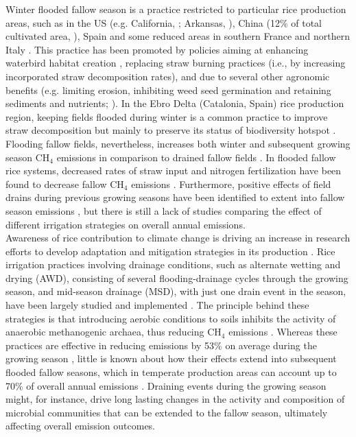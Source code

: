 Winter flooded fallow season is a practice restricted to particular rice production areas, such as in the US (e.g. California, \cite{fitzgerald2000}; Arkansas, \cite{reba2019}), China (12\% of total cultivated area, \cite{zhang2011}), Spain and some reduced areas in southern France and northern Italy \citep{pernollet2015}. This practice has been promoted by policies aiming at enhancing waterbird habitat creation \citep{elphick2010, tajiri2013effects}, replacing straw burning practices (i.e., by increasing incorporated straw decomposition rates), and due to several other agronomic benefits (e.g. limiting erosion, inhibiting weed seed germination and retaining sediments and nutrients; \cite{negri2020}). In the Ebro Delta (Catalonia, Spain) rice production region, keeping fields flooded during winter is a common practice to improve straw decomposition but mainly to preserve its status of biodiversity hotspot \citep{day2006, perez-mendez2022}. Flooding fallow fields, nevertheless, increases both winter and subsequent growing season CH$_{4}$ emissions in comparison to drained fallow fields \citep{cai2000}. In flooded fallow rice systems, decreased rates of straw input and nitrogen fertilization  have been found to decrease fallow CH$_{4}$ emissions \citep{martinez-eixarch2021a}. Furthermore, positive effects of field drains during previous growing seasons have been identified to extent into fallow season emissions \citep{martinez-eixarch2022}, but there is still a lack of studies comparing the effect of different irrigation strategies on overall annual emissions.\\


Awareness of rice contribution to climate change is driving an increase in research efforts to develop adaptation and mitigation strategies in its production \citep{alexandratos2012world, zhang2018effect, hussain2020rice}. Rice irrigation practices involving drainage conditions, such as alternate wetting and drying (AWD), consisting of several flooding-drainage cycles through the growing season, and mid-season drainage (MSD), with just one drain event in the season, have been largely studied and implemented \citep{li2004, li2014, lampayan2015}. The principle behind these strategies is that introducing aerobic conditions to soils inhibits the activity of anaerobic methanogenic archaea, thus reducing CH$_{4}$ emissions \citep{kumar2019alternate, perry2024}. Whereas these practices are effective in reducing emissions by 53\% on average during the growing season \citep{jiang2019water}, little is known about how their effects extend into subsequent flooded fallow seasons, which in temperate production areas can account up to 70\% of overall annual emissions \citep{martinez2018neglecting}. Draining events during the growing season might, for instance, drive long lasting changes in the activity and composition of microbial communities that can be extended to the fallow season, ultimately affecting overall emission outcomes. \\

